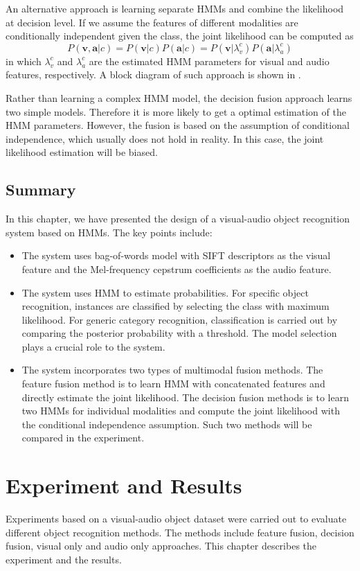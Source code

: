 \documentclass[12pt,final,twoside]{report}
\begin{document}
An alternative approach is learning separate HMMs and combine the likelihood at decision level. If we assume the features of different modalities are conditionally independent given the class, the joint likelihood can be computed as
\begin{equation}
  P(\mathbf{v},\mathbf{a}|c) = P(\mathbf{v}|c) P(\mathbf{a}|c) = P(\mathbf{v}|\lambda_v^c) P(\mathbf{a}|\lambda_a^c)
\end{equation}
in which $\lambda_{v}^c$ and $\lambda_{a}^c$ are the estimated HMM parameters for visual and audio features, respectively. A block diagram of such approach is shown in .

Rather than learning a complex HMM model, the decision fusion approach learns two simple models. Therefore it is more likely to get a optimal estimation of the HMM parameters. However, the fusion is based on the assumption of conditional independence, which usually does not hold in reality. In this case, the joint likelihood estimation will be biased.

\section{Summary}
In this chapter, we have presented the design of a visual-audio object recognition system based on HMMs. The key points include:
\begin{itemize}
  \item The system uses bag-of-words model with SIFT descriptors as the visual feature and the Mel-frequency cepstrum coefficients as the audio feature.
  \item The system uses HMM to estimate probabilities. For specific object recognition, instances are classified by selecting the class with maximum likelihood. For generic category recognition, classification is carried out by comparing the posterior probability with a threshold. The model selection plays a crucial role to the system.
  \item The system incorporates two types of multimodal fusion methods. The feature fusion method is to learn HMM with concatenated features and directly estimate the joint likelihood. The decision fusion methods is to learn two HMMs for individual modalities and compute the joint likelihood with the conditional independence assumption. Such two methods will be compared in the experiment.
\end{itemize}

\cleardoublepage
\chapter{Experiment and Results}
\label{ch:experiment}
Experiments based on a visual-audio object dataset were carried out to evaluate different object recognition methods. The methods include feature fusion, decision fusion, visual only and audio only approaches. This chapter describes the experiment and the results.
\end{document}
